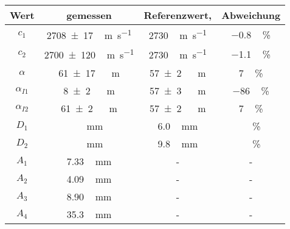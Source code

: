 \label{tab:Ergebnisse}
	\begin{tabular}{c ccc}
		\toprule
		{Wert}&{gemessen}&{Referenzwert\cite{cAcryl},\cite{alphaAcryl}}&{Abweichung} \\
		\midrule
		$c_\text{1}$ & \SI{2708\pm17}\,\si{\meter\per\second} & \SI{2730}\,\si{\meter\per\second} & \SI{-0.8}\,\si{\percent} \\
		$c_\text{2}$ & \SI{2700\pm120}\,\si{\meter\per\second} & \SI{2730}\,\si{\meter\per\second} & \SI{-1.1}\,\si{\percent} \\
		$\alpha$ & \SI{61\pm17}\,\si{\per\meter} & \SI{57\pm2}\,\si{\per\meter} & \SI{7}\,\si{\percent} \\
		$\alpha_{I1}$ & \SI{8\pm2}\,\si{\per\meter} & \SI{57\pm3}\,\si{\per\meter} & \SI{-86}\,\si{\percent} \\
		$\alpha_{I2}$ & \SI{61\pm2}\,\si{\per\meter} & \SI{57\pm2}\,\si{\per\meter} & \SI{7}\,\si{\percent} \\
		$D_1$ & \SI{}\,\si{\milli\meter} & \SI{6.0}\,\si{\milli\meter} & \SI{}\,\si{\percent} \\
		$D_2$ & \SI{}\,\si{\milli\meter} & \SI{9.8}\,\si{\milli\meter} & \SI{}\,\si{\percent} \\
		$A_1$ & \SI{7.33}\,\si{\milli\meter} & - & - \\
		$A_2$ & \SI{4.09}\,\si{\milli\meter} & - & - \\
		$A_3$ & \SI{8.90}\,\si{\milli\meter} & - & - \\
		$A_4$ & \SI{35.3}\,\si{\milli\meter} & - & - \\
		\bottomrule
	\end{tabular}
